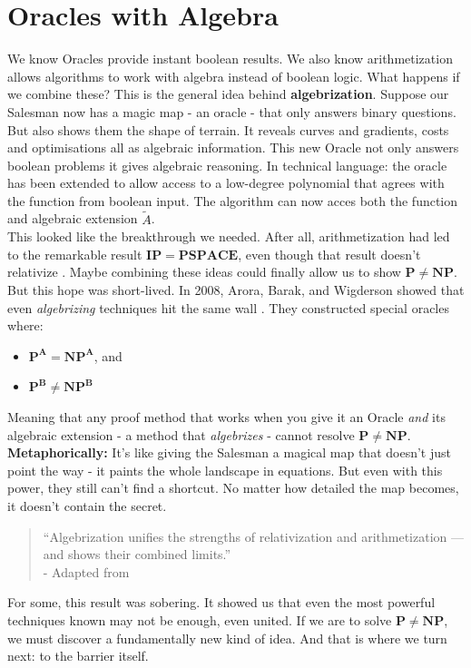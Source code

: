 \documentclass[12pt]{report}
\begin{document}
\section{Oracles with Algebra}
We know Oracles provide instant boolean results.
We also know arithmetization allows algorithms to work with algebra instead of boolean logic. 
What happens if we combine these?
This is the general idea behind \textbf{algebrization}.
Suppose our Salesman now has a magic map - an oracle - that only answers binary questions.
But also shows them the shape of terrain.
It reveals curves and gradients, costs and optimisations all as algebraic information.
This new Oracle not only answers boolean problems it gives algebraic reasoning.
In technical language: the oracle has been extended to allow access to a low-degree polynomial that agrees with the function from boolean input.
The algorithm can now acces both the function and algebraic extension $\tilde{A}$.\\
\vspace{0.3cm}
This looked like the breakthrough we needed.
After all, arithmetization had led to the remarkable result $\mathbf{IP = PSPACE}$, even though that result doesn't relativize \citep{arora2009}.
Maybe combining these ideas could finally allow us to show $\mathbf{P \ne NP}$.
But this hope was short-lived.
In 2008, Arora, Barak, and Wigderson showed that even \textit{algebrizing} techniques hit the same wall \citep{arora2008algebrization}.
They constructed special oracles where:
\begin{itemize}
    \item $\mathbf{P^A = NP^A}$, and
    \item $\mathbf{P^B \ne NP^B}$
\end{itemize}
Meaning that any proof method that works when you give it an Oracle \textit{and} its algebraic extension - a method that \textit{algebrizes} - cannot resolve $\mathbf{P \ne NP}$.\\
\vspace{0.3cm}
\textbf{Metaphorically:}  
It's like giving the Salesman a magical map that doesn't just point the way - it paints the whole landscape in equations.
But even with this power, they still can't find a shortcut.
No matter how detailed the map becomes, it doesn't contain the secret.
\begin{quote}
    “Algebrization unifies the strengths of relativization and arithmetization — and shows their combined limits.”\\
    - Adapted from \cite{arora2008algebrization}
\end{quote}
For some, this result was sobering.
It showed us that even the most powerful techniques known may not be enough, even united.
If we are to solve $\mathbf{P \ne NP}$, we must discover a fundamentally new kind of idea.
And that is where we turn next: to the barrier itself.
\end{document}
